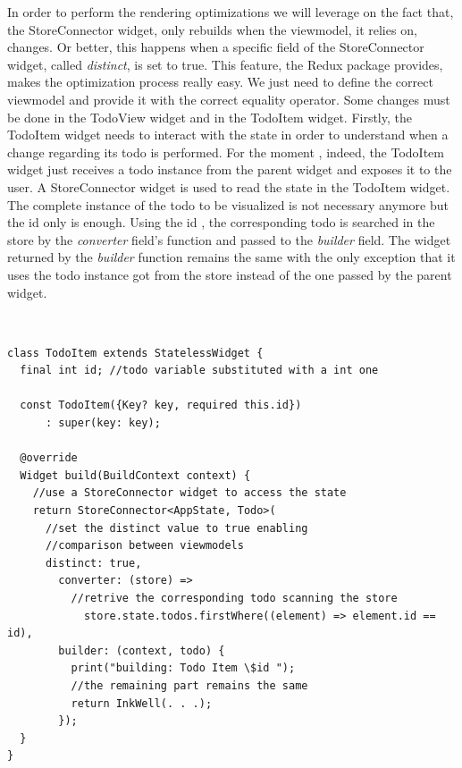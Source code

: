 In order to perform the rendering optimizations we will leverage on the fact that, the StoreConnector widget, only rebuilds when the viewmodel, it relies on, changes. Or better, this happens when a specific field of the StoreConnector widget, called \textit{distinct}, is set to true. This feature, the Redux package provides, makes the optimization process really easy. We just need to define the correct viewmodel and provide it with the correct equality operator. Some changes must be done in the TodoView widget and in the TodoItem widget. Firstly, the TodoItem widget needs to interact with the state in order to understand when a change regarding its todo is performed. For the moment , indeed, the TodoItem widget just receives a todo instance from the parent widget and exposes it to the user. A StoreConnector widget is used to read the state in the TodoItem widget. The complete instance of the todo to be visualized is not necessary anymore but the id only is enough. Using the id , the corresponding todo is searched in the store by the \textit{converter} field’s function and passed to the \textit{builder} field. The widget returned by the \textit{builder} function remains the same with the only exception that it uses the todo instance got from the store instead of the one passed by the parent widget. 
\begin{code}
\mbox{}\\
 \mbox{}
		\label{code:2.14}
\begin{verbatim}
class TodoItem extends StatelessWidget {
  final int id; //todo variable substituted with a int one

  const TodoItem({Key? key, required this.id})
      : super(key: key);

  @override
  Widget build(BuildContext context) {
    //use a StoreConnector widget to access the state
    return StoreConnector<AppState, Todo>(
      //set the distinct value to true enabling 
      //comparison between viewmodels
      distinct: true, 
        converter: (store) =>
          //retrive the corresponding todo scanning the store
            store.state.todos.firstWhere((element) => element.id == id),
        builder: (context, todo) {
          print("building: Todo Item \$id ");
          //the remaining part remains the same
          return InkWell(. . .);
        });
  }
}
\end{verbatim}
\mbox{}
\end{code}


